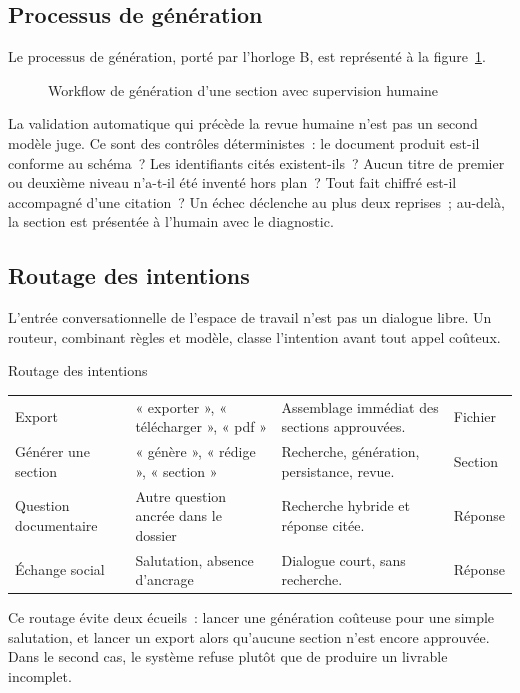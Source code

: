 \subsection{Processus de génération}

Le processus de génération, porté par l'horloge B, est représenté à la
figure~\ref{fig:workflow-generation}.

\begin{figure}[htbp]
  \centering
  \resizebox{0.92\linewidth}{!}{}
  \caption{Workflow de génération d'une section avec supervision humaine}
  \label{fig:workflow-generation}
\end{figure}

La validation automatique qui précède la revue humaine n'est pas un
second modèle juge. Ce sont des contrôles déterministes~: le document
produit est-il conforme au schéma~? Les identifiants cités existent-ils~?
Aucun titre de premier ou deuxième niveau n'a-t-il été inventé hors plan~?
Tout fait chiffré est-il accompagné d'une citation~? Un échec déclenche
au plus deux reprises~; au-delà, la section est présentée à l'humain avec
le diagnostic.

\subsection{Routage des intentions}

L'entrée conversationnelle de l'espace de travail n'est pas un dialogue
libre. Un routeur, combinant règles et modèle, classe l'intention avant
tout appel coûteux.

\begin{btptable}{Routage des intentions}
\label{tab:intentions}
\begin{tabularx}{\linewidth}{@{}L{2.6cm} Y L{3.4cm} L{2.4cm}@{}}
\toprule
{}
 &  &  &  \\
\midrule
Export & « exporter », « télécharger », « pdf » & Assemblage immédiat des sections approuvées. & Fichier \\
Générer une section & « génère », « rédige », « section » & Recherche, génération, persistance, revue. & Section \\
Question documentaire & Autre question ancrée dans le dossier & Recherche hybride et réponse citée. & Réponse \\
Échange social & Salutation, absence d'ancrage & Dialogue court, sans recherche. & Réponse \\
\bottomrule
\end{tabularx}
\end{btptable}

Ce routage évite deux écueils~: lancer une génération coûteuse pour une
simple salutation, et lancer un export alors qu'aucune section n'est
encore approuvée. Dans le second cas, le système refuse plutôt que de
produire un livrable incomplet.
